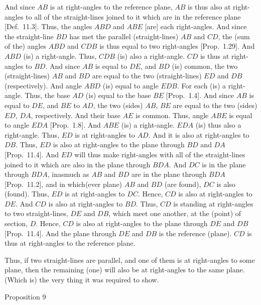 And since $AB$ is at right-angles to the reference plane, $AB$ is thus also
at right-angles to all of the straight-lines joined to it which are in the
reference plane [Def.~11.3].  Thus, the angles $ABD$ and $ABE$ [are] each right-angles. And since the straight-line $BD$ has
met the parallel (straight-lines) $AB$ and $CD$, the (sum of the) angles
$ABD$ and $CDB$ is thus equal to two right-angles [Prop.~1.29]. And $ABD$ (is) a right-angle. Thus, $CDB$ (is)
also a right-angle. $CD$ is thus at right-angles to $BD$. And since $AB$
is equal to $DE$, and $BD$ (is) common, the two (straight-lines) $AB$ and
$BD$ are equal to the two (straight-lines) $ED$ and $DB$ (respectively). And angle
$ABD$ (is) equal to angle $EDB$. For each (is) a right-angle.
Thus, the base $AD$ (is) equal to the base $BE$ [Prop.~1.4]. And since $AB$ is equal to $DE$, and $BE$ to $AD$, 
the two (sides) $AB$, $BE$ are equal to the two (sides) $ED$, $DA$,
respectively. And their base $AE$ is common. Thus, angle $ABE$ is equal to
angle $EDA$ [Prop.~1.8]. And $ABE$ (is) a
right-angle. $EDA$ (is) thus also a right-angle. Thus, $ED$ is
at right-angles to $AD$. And it is also at right-angles to $DB$. Thus, $ED$
is also at right-angles to the plane through $BD$ and $DA$ [Prop.~11.4]. And $ED$ will thus  make right-angles
with all of the straight-lines joined to it which are also in the plane through
$BDA$. And $DC$ is in the plane through $BDA$, inasmuch as
$AB$ and $BD$ are in the plane through $BDA$ [Prop.~11.2], and in which(ever plane)
$AB$ and $BD$ (are found), $DC$ is also (found). Thus, $ED$ is at right-angles to $DC$. Hence, $CD$ is also at right-angles to $DE$. And
$CD$ is also at right-angles to $BD$. Thus, $CD$ is standing  at right-angles
to two straight-lines, $DE$ and $DB$, which meet one another, at the 
(point) of section, $D$. Hence, $CD$ is also at
right-angles to the plane through $DE$ and $DB$ [Prop.~11.4]. And the plane through $DE$ and $DB$ is the reference
(plane). $CD$ is thus at right-angles to the reference plane.

Thus, if  two  straight-lines are parallel, and one of them is at right-angles to some plane, then the remaining (one) will also
be at right-angles to the same plane. (Which is) the very thing it was required to show.


\begin{center}
{\large Proposition 9}
\end{center}

